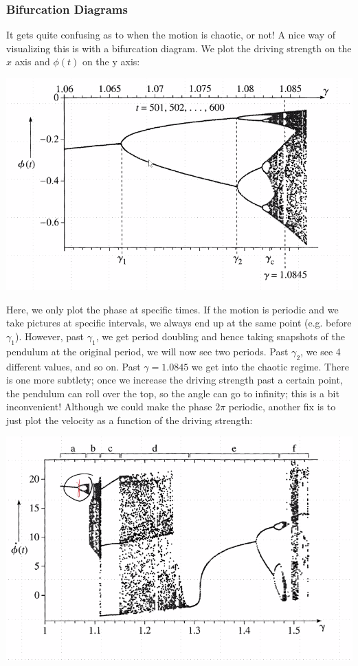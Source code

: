 \subsubsection{Bifurcation Diagrams}
It gets quite confusing as to when the motion is chaotic, or not! A nice way of visualizing this is with a bifurcation diagram. We plot the driving strength on the $x$ axis and $\phi(t)$ on the y axis:
\begin{center}
    \includegraphics[scale=0.6]{Lecture-33/l33-img9.png}
\end{center}
Here, we only plot the phase at specific times. If the motion is periodic and we take pictures at specific intervals, we always end up at the same point (e.g. before $\gamma_1$). However, past $\gamma_1$, we get period doubling and hence taking snapshots of the pendulum at the original period, we will now see two periods. Past $\gamma_2$, we see 4 different values, and so on. Past $\gamma = 1.0845$ we get into the chaotic regime. There is one more subtlety; once we increase the driving strength past a certain point, the pendulum can roll over the top, so the angle can go to infinity; this is a bit inconvenient! Although we could make the phase $2\pi$ periodic, another fix is to just plot the velocity as  a function of the driving strength:
\begin{center}
    \includegraphics[scale=0.6]{Lecture-33/l33-img10.png}
\end{center}
